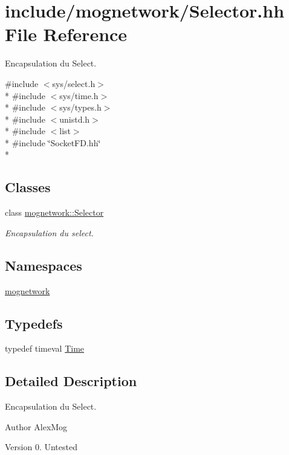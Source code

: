\hypertarget{_selector_8hh}{\section{include/mognetwork/\-Selector.hh File Reference}
\label{_selector_8hh}
}


Encapsulation du Select.  


{\ttfamily \#include $<$sys/select.\-h$>$}\\*
{\ttfamily \#include $<$sys/time.\-h$>$}\\*
{\ttfamily \#include $<$sys/types.\-h$>$}\\*
{\ttfamily \#include $<$unistd.\-h$>$}\\*
{\ttfamily \#include $<$list$>$}\\*
{\ttfamily \#include \char`\"{}Socket\-F\-D.\-hh\char`\"{}}\\*
\subsection*{Classes}
\begin{DoxyCompactItemize}
\item 
class \hyperlink{classmognetwork_1_1_selector}{mognetwork\-::\-Selector}
\begin{DoxyCompactList}\small\item\em Encapsulation du select. \end{DoxyCompactList}\end{DoxyCompactItemize}
\subsection*{Namespaces}
\begin{DoxyCompactItemize}
\item 
\hyperlink{namespacemognetwork}{mognetwork}
\end{DoxyCompactItemize}
\subsection*{Typedefs}
\begin{DoxyCompactItemize}
\item 
typedef timeval \hyperlink{_selector_8hh_af47ac292ef7224cf549b944d138ba4ae}{Time}
\end{DoxyCompactItemize}


\subsection{Detailed Description}
Encapsulation du Select. \begin{DoxyAuthor}{Author}
Alex\-Mog 
\end{DoxyAuthor}
\begin{DoxyVersion}{Version}
0.  Untested 
\end{DoxyVersion}



